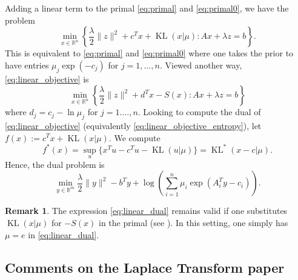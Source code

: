 \documentclass[10pt,a4paper]{article}
\numberwithin{equation}{section}
\theoremstyle{definition}
\newtheorem{remark}[theorem]{Remark}
\def\rr{{\mathbb R}}
\DeclareMathOperator{\KL}{KL}
\begin{document}
Adding a linear term to the primal \eqref{eq:primal} and \eqref{eq:primal0}, we have the problem 
\begin{equation}\label{eq:linear_objective}
    \min_{x \in \rr^n} \left\{ \frac{\lambda}{2} \lVert z \rVert^2 + c^Tx + \KL(x| \mu) : Ax + \lambda z = b \right\}.
\end{equation}
This is equivalent to \eqref{eq:primal} and \eqref{eq:primal0} where one takes the prior to have entries $\mu_j \exp{(-c_j)}$ for $j=1,\dots,n$. Viewed another way, \eqref{eq:linear_objective} is 
\begin{equation}\label{eq:linear_objective_entropy}
     \min_{x \in \rr^n} \left\{ \frac{\lambda}{2} \lVert z \rVert^2 + d^Tx - S(x) : Ax + \lambda z = b \right\}
\end{equation}
where $d_j = c_j - \ln \mu_j$ for $j=1.\dots,n$. Looking to compute the dual of \eqref{eq:linear_objective} (equivalently \eqref{eq:linear_objective_entropy}), let $f(x) :=  c^Tx + \KL(x| \mu)$. We compute
\[
    f^\ast(x) = \sup_{u} \{ x^Tu - c^Tu - \KL(u| \mu) \} = \KL^\ast(x-c| \mu).
\]
Hence, the dual problem is 
\begin{equation}\label{eq:linear_dual}
    \min_{y \in \rr^m} \frac{\lambda}{2} \lVert y \rVert^2 - b^Ty +  \log \left(\sum_{i=1}^n \mu_i \exp(A_i^T y - c_i)\right).
\end{equation}

\begin{remark}
    The expression \eqref{eq:linear_dual} remains valid if one substitutes $\KL(x|\mu)$ for $-S(x)$ in the primal (see \cite[Example 11.12]{RockWets98}). In this setting, one simply has $\mu = e$ in \eqref{eq:linear_dual}.
\end{remark}




   \subsection{Comments on the Laplace Transform paper}
\end{document}
